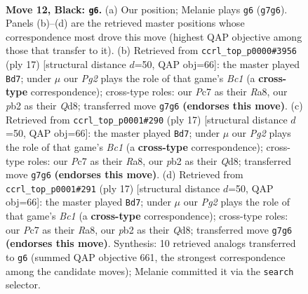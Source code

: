 \documentclass[11pt]{article}
\begin{document}
\clearpage

\begin{figure}[p]\centering
\begin{subfigure}{0.46\textwidth}\centering
\resizebox{\linewidth}{!}{%
\newchessgame
\chessboard[
  setfen={r1bq1rk1/2p1bppp/p1np1n2/4p3/Pp2P3/1B1P1Q1N/1PP2PPP/RNB1R1K1 b - - 2 12},
  showmover=false,
  pgfstyle=straightmove, color=movearrow, markmove={g7-g6}
]}
\caption{}
\end{subfigure}\hfill
\begin{subfigure}{0.46\textwidth}\centering
\resizebox{\linewidth}{!}{%
\newchessgame
\chessboard[
  setfen={r1bq1rk1/2p1bppp/p1np1n2/1p2p3/P3P3/1B1P1N2/1PP2PPP/RNBQR1K1 b - - 0 9},
  showmover=false,
  pgfstyle=straightmove, color=movearrow, markmove={c8-d7}
]}
\caption{}
\end{subfigure}
\\[4pt]
\begin{subfigure}{0.46\textwidth}\centering
\resizebox{\linewidth}{!}{%
\newchessgame
\chessboard[
  setfen={r1bq1rk1/2p1bppp/p1np1n2/1p2p3/P3P3/1B1P1N2/1PP2PPP/RNBQR1K1 b - - 0 9},
  showmover=false,
  pgfstyle=straightmove, color=movearrow, markmove={c8-d7}
]}
\caption{}
\end{subfigure}\hfill
\begin{subfigure}{0.46\textwidth}\centering
\resizebox{\linewidth}{!}{%
\newchessgame
\chessboard[
  setfen={r1bq1rk1/2p1bppp/p1np1n2/1p2p3/P3P3/1B1P1N2/1PP2PPP/RNBQR1K1 b - - 0 9},
  showmover=false,
  pgfstyle=straightmove, color=movearrow, markmove={c8-d7}
]}
\caption{}
\end{subfigure}
\caption{\textbf{Move 12, Black: \texttt{g6}.} (a) Our position; Melanie plays \texttt{g6} (\texttt{g7g6}). Panels (b)--(d) are the retrieved master positions whose correspondence most drove this move (highest QAP objective among those that transfer to it). (b) Retrieved from \texttt{ccrl\_top\_p0000\#3956} (ply 17) [structural distance $d$=50, QAP obj=66]: the master played \texttt{Bd7}; under $\mu$ our \emph{Pg2} plays the role of that game's \emph{Bc1} (a \textbf{cross-type} correspondence); cross-type roles: our \emph{P}c7 as their \emph{R}a8, our \emph{p}b2 as their \emph{Q}d8; transferred move \texttt{g7g6} \textbf{(endorses this move)}. (c) Retrieved from \texttt{ccrl\_top\_p0001\#290} (ply 17) [structural distance $d$=50, QAP obj=66]: the master played \texttt{Bd7}; under $\mu$ our \emph{Pg2} plays the role of that game's \emph{Bc1} (a \textbf{cross-type} correspondence); cross-type roles: our \emph{P}c7 as their \emph{R}a8, our \emph{p}b2 as their \emph{Q}d8; transferred move \texttt{g7g6} \textbf{(endorses this move)}. (d) Retrieved from \texttt{ccrl\_top\_p0001\#291} (ply 17) [structural distance $d$=50, QAP obj=66]: the master played \texttt{Bd7}; under $\mu$ our \emph{Pg2} plays the role of that game's \emph{Bc1} (a \textbf{cross-type} correspondence); cross-type roles: our \emph{P}c7 as their \emph{R}a8, our \emph{p}b2 as their \emph{Q}d8; transferred move \texttt{g7g6} \textbf{(endorses this move)}. Synthesis: 10 retrieved analogs transferred to \texttt{g6} (summed QAP objective 661, the strongest correspondence among the candidate moves); Melanie committed it via the \texttt{search} selector.}

\end{figure}
\end{document}

